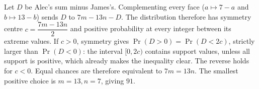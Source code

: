 Let $D$ be Alec's sum minus James's. Complementing every face ($a\mapsto7-a$ and $b\mapsto13-b$) sends $D$ to $7m-13n-D$. The distribution therefore has symmetry centre $c=\dfrac{7m-13n}{2}$ and positive probability at every integer between its extreme values. If $c>0$, symmetry gives $\Pr(D>0)=\Pr(D<2c)$, strictly larger than $\Pr(D<0)$: the interval $[0,2c)$ contains support values, unless all support is positive, which already makes the inequality clear. The reverse holds for $c<0$. Equal chances are therefore equivalent to $7m=13n$. The smallest positive choice is $m=13,n=7$, giving $\boxed{91}$.
